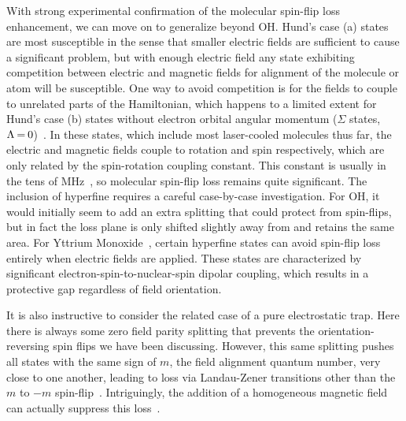 \documentclass[defaultstyle,11pt]{thesis}
\begin{document}
With strong experimental confirmation of the molecular spin-flip loss enhancement, we can move on to generalize beyond OH.
Hund's case (a) states are most susceptible in the sense that smaller electric fields are sufficient to cause a significant problem, but with enough electric field any state exhibiting competition between electric and magnetic fields for alignment of the molecule or atom will be susceptible.
One way to avoid competition is for the fields to couple to unrelated parts of the Hamiltonian, which happens to a limited extent for Hund's case (b) states without electron orbital angular momentum ($\Sigma$ states, $\Lambda{\nobreak\hspace{.2em}} {=}{\nobreak\hspace{.2em}} 0$)~\cite{Bohn2013}.
In these states, which include most laser-cooled molecules thus far, the electric and magnetic fields couple to rotation and spin respectively, which are only related by the spin-rotation coupling constant.
This constant is usually in the tens of MHz~\cite{Quemener2016}, so molecular spin-flip loss remains quite significant.
The inclusion of hyperfine requires a careful case-by-case investigation. For OH, it would initially seem to add an extra splitting that could protect from spin-flips, but in fact the loss plane is only shifted slightly away from \epb{} and retains the same area.
For Yttrium Monoxide~\cite{Collopy2018}, certain hyperfine states can avoid spin-flip loss entirely when electric fields are applied.
These states are characterized by significant electron-spin-to-nuclear-spin dipolar coupling, which results in a protective gap regardless of field orientation.

It is also instructive to consider the related case of a pure electrostatic trap.
Here there is always some zero field parity splitting that prevents the orientation-reversing spin flips we have been discussing.
However, this same splitting pushes all states with the same sign of $m$, the field alignment quantum number, very close to one another, leading to loss via Landau-Zener transitions other than the $m$ to $-m$ spin-flip~\cite{Wall2010}.
Intriguingly, the addition of a homogeneous magnetic field can actually suppress this loss~\cite{Meek2011}.
\end{document}
